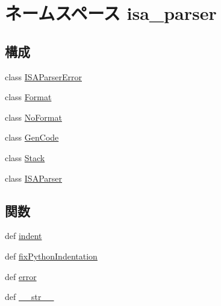 \hypertarget{namespaceisa__parser}{
\section{ネームスペース isa\_\-parser}
\label{namespaceisa__parser}
}
\subsection*{構成}
\begin{DoxyCompactItemize}
\item 
class \hyperlink{classisa__parser_1_1ISAParserError}{ISAParserError}
\item 
class \hyperlink{classisa__parser_1_1Format}{Format}
\item 
class \hyperlink{classisa__parser_1_1NoFormat}{NoFormat}
\item 
class \hyperlink{classisa__parser_1_1GenCode}{GenCode}
\item 
class \hyperlink{classisa__parser_1_1Stack}{Stack}
\item 
class \hyperlink{classisa__parser_1_1ISAParser}{ISAParser}
\end{DoxyCompactItemize}
\subsection*{関数}
\begin{DoxyCompactItemize}
\item 
def \hyperlink{namespaceisa__parser_a1c088ad12029969bc19bfc9d6310a1ff}{indent}
\item 
def \hyperlink{namespaceisa__parser_a86bdb64058c060034cc20d92a605d256}{fixPythonIndentation}
\item 
def \hyperlink{namespaceisa__parser_ab56fc28638990c585c24f2440416dd68}{error}
\item 
def \hyperlink{namespaceisa__parser_a0215b0e1a33f2670ee7c0eff7b82d988}{\_\-\_\-str\_\-\_\-}
\end{DoxyCompactItemize}
